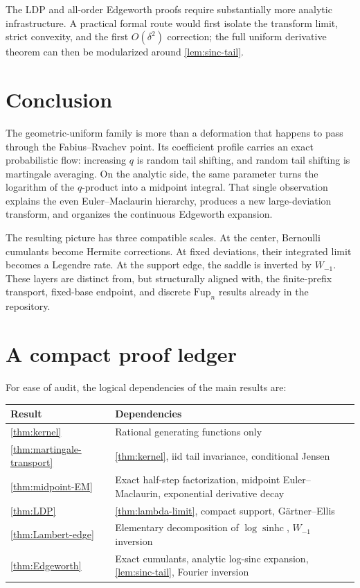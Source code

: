 \documentclass[11pt,a4paper]{article}
\theoremstyle{definition}
\newcommand{\sinhc}{\operatorname{sinhc}}
\begin{document}
The LDP and all-order Edgeworth proofs require substantially more analytic
infrastructure.  A practical formal route would first isolate the transform
limit, strict convexity, and the first $O(\delta^2)$ correction; the full
uniform derivative theorem can then be modularized around
\cref{lem:sinc-tail}.

\section{Conclusion}

The geometric-uniform family is more than a deformation that happens to pass
through the Fabius--Rvachev point.  Its coefficient profile carries an exact
probabilistic flow: increasing $q$ is random tail shifting, and random tail
shifting is martingale averaging.  On the analytic side, the same parameter
turns the logarithm of the $q$-product into a midpoint integral.  That single
observation explains the even Euler--Maclaurin hierarchy, produces a new
large-deviation transform, and organizes the continuous Edgeworth expansion.

The resulting picture has three compatible scales.  At the center, Bernoulli
cumulants become Hermite corrections.  At fixed deviations, their integrated
limit becomes a Legendre rate.  At the support edge, the saddle is inverted by
$W_{-1}$.  These layers are distinct from, but structurally aligned with, the
finite-prefix transport, fixed-base endpoint, and discrete $\mathrm{Fup}_n$
results already in the repository.

\appendix

\section{A compact proof ledger}
\label{app:ledger}

For ease of audit, the logical dependencies of the main results are:

\begin{center}
\begin{tabularx}{0.96\textwidth}{@{}lX@{}}
\toprule
Result & Dependencies \\
\midrule
\cref{thm:kernel} & Rational generating functions only \\
\cref{thm:martingale-transport} & \cref{thm:kernel}, iid tail invariance,
conditional Jensen \\
\cref{thm:midpoint-EM} & Exact half-step factorization, midpoint
Euler--Maclaurin, exponential derivative decay \\
\cref{thm:LDP} & \cref{thm:lambda-limit}, compact support,
G\"artner--Ellis \\
\cref{thm:Lambert-edge} & Elementary decomposition of $\log\sinhc$,
$W_{-1}$ inversion \\
\cref{thm:Edgeworth} & Exact cumulants, analytic log-sinc expansion,
\cref{lem:sinc-tail}, Fourier inversion \\
\bottomrule
\end{tabularx}
\end{center}
\end{document}
